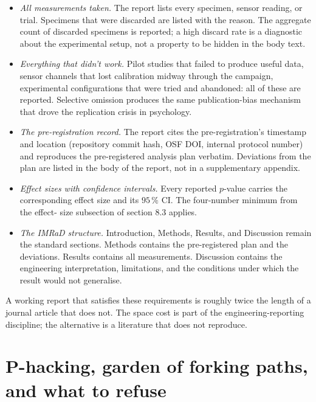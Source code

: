 \begin{itemize}[leftmargin=*]
  \item \textit{All measurements taken.} The report lists every
    specimen, sensor reading, or trial. Specimens that were
    discarded are listed with the reason. The aggregate count of
    discarded specimens is reported; a high discard rate is a
    diagnostic about the experimental setup, not a property to
    be hidden in the body text.
  \item \textit{Everything that didn't work.} Pilot studies that
    failed to produce useful data, sensor channels that lost
    calibration midway through the campaign, experimental
    configurations that were tried and abandoned: all of these
    are reported. Selective omission produces the same
    publication-bias mechanism that drove the replication crisis
    in psychology.
  \item \textit{The pre-registration record.} The report cites
    the pre-registration's timestamp and location (repository
    commit hash, OSF DOI, internal protocol number) and
    reproduces the pre-registered analysis plan verbatim.
    Deviations from the plan are listed in the body of the
    report, not in a supplementary appendix.
  \item \textit{Effect sizes with confidence intervals.} Every
    reported $p$-value carries the corresponding effect size and
    its $95 \,\%$ CI. The four-number minimum from the effect-
    size subsection of section 8.3 applies.
  \item \textit{The IMRaD structure.} Introduction, Methods,
    Results, and Discussion remain the standard sections.
    Methods contains the pre-registered plan and the deviations.
    Results contains all measurements. Discussion contains the
    engineering interpretation, limitations, and the conditions
    under which the result would not generalise.
\end{itemize}

A working report that satisfies these requirements is
roughly twice the length of a journal article that does not.
The space cost is part of the engineering-reporting discipline;
the alternative is a literature that does not reproduce.

\section{P-hacking, garden of forking paths, and what to refuse}

